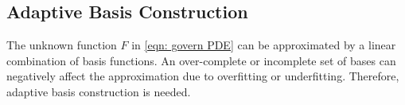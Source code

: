 %



\subsection{Adaptive Basis Construction}
\label{sec: adaptive basis review}

The unknown function $F$ in \eqref{eqn: govern PDE} can be approximated by a linear
combination of basis functions. An over-complete or
incomplete set of bases can negatively affect the approximation due to overfitting or underfitting.
Therefore, adaptive basis construction is needed.\\

